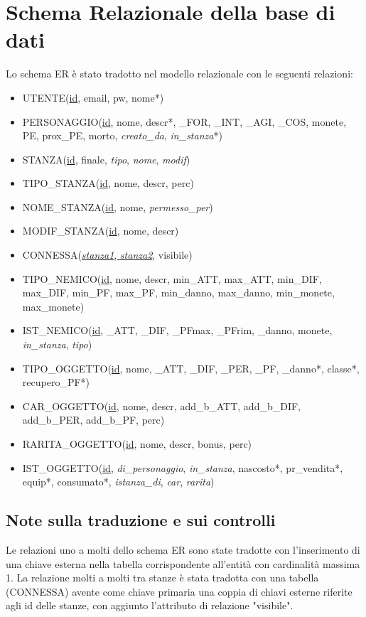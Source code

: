 \documentclass[10pt,a4paper]{article}
\begin{document}
\section{Schema Relazionale della base di dati}
Lo schema ER è stato tradotto nel modello relazionale con le seguenti relazioni:
\begin{itemize}[leftmargin=*]
  \item[] UTENTE(\underline{id}, email, pw, nome*)
  \item[] PERSONAGGIO(\underline{id}, nome, descr*, \_FOR, \_INT, \_AGI, \_COS, monete, PE, prox\_PE, morto, \textit{creato\_da}, \textit{in\_stanza}*)
  \item[] STANZA(\underline{id}, finale, \textit{tipo}, \textit{nome}, \textit{modif})
  \item[] TIPO\_STANZA(\underline{id}, nome, descr, perc)
  \item[] NOME\_STANZA(\underline{id}, nome, \textit{permesso\_per})
  \item[] MODIF\_STANZA(\underline{id}, nome, descr)
  \item[] CONNESSA(\underline{\textit{stanza1}, \textit{stanza2}}, visibile)
  \item[] TIPO\_NEMICO(\underline{id}, nome, descr, min\_ATT, max\_ATT, min\_DIF, max\_DIF, min\_PF, max\_PF, min\_danno, max\_danno, min\_monete, max\_monete)
  \item[] IST\_NEMICO(\underline{id}, \_ATT, \_DIF, \_PFmax, \_PFrim, \_danno, monete, \textit{in\_stanza}, \textit{tipo})
  \item[] TIPO\_OGGETTO(\underline{id}, nome, \_ATT, \_DIF, \_PER, \_PF, \_danno*, classe*, recupero\_PF*)
  \item[] CAR\_OGGETTO(\underline{id}, nome, descr, add\_b\_ATT, add\_b\_DIF, add\_b\_PER, add\_b\_PF, perc)
  \item[] RARITA\_OGGETTO(\underline{id}, nome, descr, bonus, perc)
  \item[] IST\_OGGETTO(\underline{id}, \textit{di\_personaggio}, \textit{in\_stanza}, nascosto*, pr\_vendita*, equip*, consumato*, \textit{istanza\_di}, \textit{car}, \textit{rarita})
\end{itemize}

\subsection{Note sulla traduzione e sui controlli}
Le relazioni uno a molti dello schema ER sono state tradotte con l'inserimento di una chiave esterna nella tabella corrispondente all'entità con cardinalità massima 1. La relazione molti a molti tra stanze è stata tradotta con una tabella (CONNESSA) avente come chiave primaria una coppia di chiavi esterne riferite agli id delle stanze, con aggiunto l'attributo di relazione "visibile".
\end{document}
